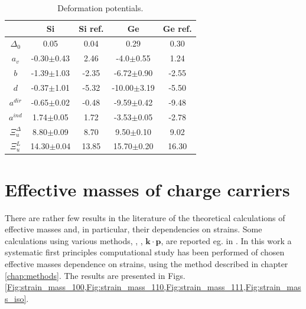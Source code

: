 \begin{table}[!htbp]
\centering
\caption{Deformation potentials.}
\begin{tabular}{|c|c|c|c|c|}
\hline
                 & Si    & Si ref. & Ge    & Ge ref. \\ \hline
$\Delta_0$       & 0.05 & 0.04 \cite{pot-def}  & 0.29  & 0.30 \cite{pot-def}    \\ \hline
$a_v$            & -0.30$\pm$0.43  & 2.46 \cite{pot-def} & -4.0$\pm$0.55  & 1.24 \cite{pot-def}  \\ \hline
$b$              & -1.39$\pm$1.03 & -2.35 \cite{pot-def}    & -6.72$\pm$0.90 & -2.55 \cite{pot-def}  \\ \hline
$d$              & -0.37$\pm$1.01 & -5.32 \cite{pot-def}    & -10.00$\pm$3.19   & -5.50 \cite{pot-def}   \\ \hline
$a^{dir}$        & -0.65$\pm$0.02 & -0.48 \cite{pot-def}    & -9.59$\pm$0.42 & -9.48 \cite{pot-def}  \\ \hline
$a^{ind}$        & 1.74$\pm$0.05  & 1.72 \cite{pot-def} & -3.53$\pm$0.05 & -2.78 \cite{pot-def}  \\ \hline
$\Xi_u^\Delta$   & 8.80$\pm$0.09   & 8.70 \cite{pot-def}    & 9.50$\pm$0.10   & 9.02 \cite{mass-pot} \\ \hline
$\Xi_u^L$        & 14.30$\pm$0.04  & 13.85 \cite{mass-pot}  & 15.70$\pm$0.20  & 16.30 \cite{pot-def} \\ \hline
\end{tabular}
\label{Tab:strain_deformation}
\end{table}

\ornament

\section{Effective masses of charge carriers}

There are rather few results in the literature of the theoretical calculations of effective masses and, in particular, their dependencies on strains.
Some calculations using various methods, \abinitio, \TB, $\mathbf{k}\cdot \mathbf{p}$, are reported eg. in \cite{mass-dft, mass-tb, mass-kp}.
In this work a systematic first principles computational study has been performed of chosen effective masses dependence on strains, using the method described in chapter \ref{chap:methods}.
The results are presented in Figs. \cref{Fig:strain_mass_100,Fig:strain_mass_110,Fig:strain_mass_111,Fig:strain_mass_iso}.


